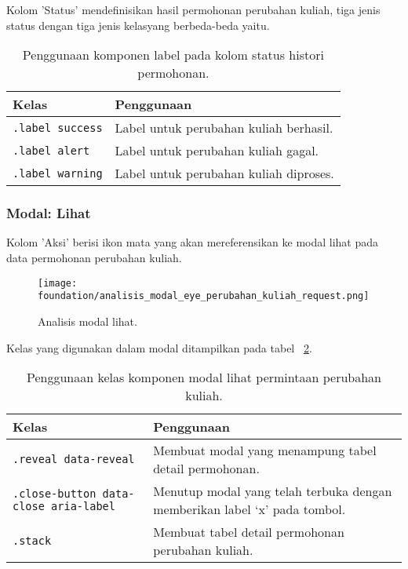Kolom 'Status' mendefinisikan hasil permohonan perubahan kuliah, tiga jenis status dengan tiga jenis kelasyang berbeda-beda yaitu.\\

\begin{table}[H]
	\centering
	\caption{Penggunaan komponen label pada kolom status histori permohonan.}
	\begin{tabularx}{\textwidth}{lX}
		\toprule
		Kelas     & Penggunaan \\
		\midrule
		 \texttt{.label success} & Label untuk perubahan kuliah berhasil.\\
		 \texttt{.label alert} & Label untuk perubahan kuliah gagal.\\
		 \texttt{.label warning} & Label untuk perubahan kuliah diproses.\\
		\bottomrule
	\end{tabularx}%
	\label{table:analisisLabelPermintaanPerubahanKuliah}
\end{table}

\subsubsection{Modal: Lihat}
Kolom 'Aksi' berisi ikon mata yang akan mereferensikan ke modal lihat pada data permohonan perubahan kuliah. \\
\begin{figure} [H]
	\centering  
	\texttt{[image: foundation/analisis\_modal\_eye\_perubahan\_kuliah\_request.png]}
	\caption{Analisis modal lihat.}
	\label{fig:analisisModalPermintaanPerubahanKuliah}
\end{figure}

\noindent Kelas yang digunakan dalam modal ditampilkan pada tabel ~\ref{table:analisisModalPermintaanPerubahanKuliah}.\\
\begin{table}[H]
	\centering
	\caption{Penggunaan kelas komponen modal lihat permintaan perubahan kuliah.}
	\begin{tabularx}{\textwidth}{lX}
		\toprule
		Kelas     & Penggunaan \\
		\midrule
		 \texttt{.reveal data-reveal} & Membuat modal yang menampung tabel detail permohonan.\\
		 \texttt{.close-button data-close aria-label} & Menutup modal yang telah terbuka dengan memberikan label `x' pada tombol.\\
		 \texttt{.stack} &	Membuat tabel detail permohonan perubahan kuliah.\\
		\bottomrule
	\end{tabularx}%
	\label{table:analisisModalPermintaanPerubahanKuliah}
\end{table}

